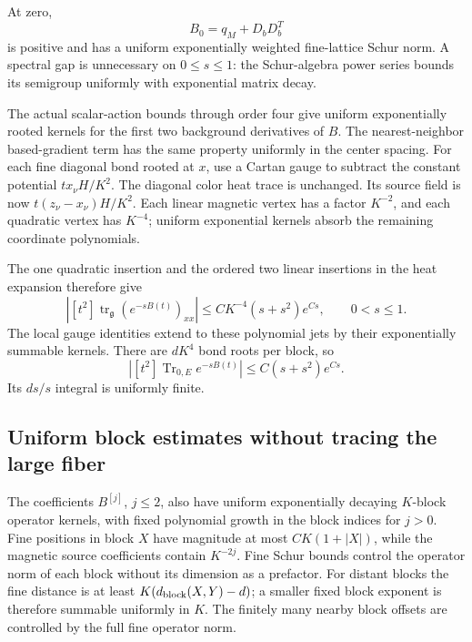 \documentclass[11pt]{article}
\theoremstyle{remark}
\begin{document}
At zero,
\[
                 B_0=q_M+D_bD_b^T
\]
is positive and has a uniform exponentially weighted
fine-lattice Schur norm. A spectral gap is unnecessary
on \(0\le s\le1\): the Schur-algebra power series bounds
its semigroup uniformly with exponential matrix decay.

The actual scalar-action bounds through order four
give uniform exponentially rooted kernels for the
first two background derivatives of \(B\).
The nearest-neighbor based-gradient term has the same
property uniformly in the center spacing.
For each fine diagonal bond rooted at \(x\), use a
Cartan gauge to subtract the constant potential
\(t x_\nu H/K^2\). The diagonal color heat trace is
unchanged. Its source field is now
\(t(z_\nu-x_\nu)H/K^2\). Each linear magnetic vertex
has a factor \(K^{-2}\), and each quadratic vertex
has \(K^{-4}\); uniform exponential kernels absorb
the remaining coordinate polynomials.

The one quadratic insertion and the ordered two linear
insertions in the heat expansion therefore give
\begin{equation}
 \left|[t^2]\operatorname{tr}_{\mathfrak g}
                         (e^{-sB(t)})_{xx}\right|
        \le CK^{-4}(s+s^2)e^{Cs},\qquad 0<s\le1.
 \label{vst-base-diagonal}
\end{equation}
The local gauge identities extend to these polynomial
jets by their exponentially summable kernels.
There are \(dK^4\) bond roots per block, so
\begin{equation}
 \left|[t^2]\operatorname{Tr}_{0,E}e^{-sB(t)}\right|
                  \le C(s+s^2)e^{Cs}.
 \label{vst-base-trace}
\end{equation}
Its \(ds/s\) integral is uniformly finite.

\subsection{Uniform block estimates without tracing the large fiber}
\label{vst-block-section}

The coefficients \(B^{[j]}\), \(j\le2\), also have
uniform exponentially decaying \(K\)-block operator
kernels, with fixed polynomial growth in the block
indices for \(j>0\). Fine positions in block \(X\)
have magnitude at most \(CK(1+|X|)\), while the
magnetic source coefficients contain \(K^{-2j}\).
Fine Schur bounds control the operator norm of each
block without its dimension as a prefactor.
For distant blocks the fine distance is at least
\(K(d_{\rm block}(X,Y)-d)\); a smaller fixed block
exponent is therefore summable uniformly in \(K\).
The finitely many nearby block offsets are controlled
by the full fine operator norm.
\end{document}
